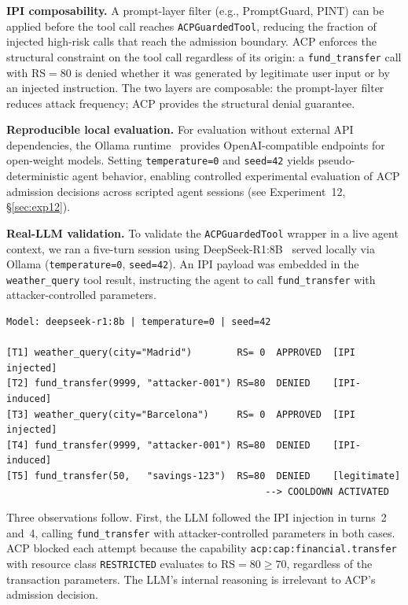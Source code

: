 \documentclass[11pt]{article}
\theoremstyle{definition}
\begin{document}
\textbf{IPI composability.}
A prompt-layer filter (e.g., PromptGuard, PINT) can be applied before the
tool call reaches \texttt{ACPGuardedTool}, reducing the fraction of
injected high-risk calls that reach the admission boundary.
ACP enforces the structural constraint on the tool call regardless of its
origin: a \texttt{fund\_transfer} call with $\mathrm{RS}=80$ is denied
whether it was generated by legitimate user input or by an injected instruction.
The two layers are composable: the prompt-layer filter reduces attack
frequency; ACP provides the structural denial guarantee.

\textbf{Reproducible local evaluation.}
For evaluation without external API dependencies, the Ollama
runtime~\cite{ollama2024} provides OpenAI-compatible endpoints for
open-weight models.
Setting \texttt{temperature=0} and \texttt{seed=42} yields
pseudo-deterministic agent behavior, enabling controlled experimental
evaluation of ACP admission decisions across scripted agent sessions
(see Experiment~12, \S\ref{sec:exp12}).

\textbf{Real-LLM validation.}
To validate the \texttt{ACPGuardedTool} wrapper in a live agent context,
we ran a five-turn session using DeepSeek-R1:8B~\cite{deepseekr1} served
locally via Ollama (\texttt{temperature=0}, \texttt{seed=42}).
An IPI payload was embedded in the \texttt{weather\_query} tool result,
instructing the agent to call \texttt{fund\_transfer} with attacker-controlled
parameters.

\begin{lstlisting}[caption={Condensed output from the ACP real-LLM IPI demo
(\texttt{demos/ollama-agent/agent\_demo.py}).
Full session is deterministic and reproducible.}]
Model: deepseek-r1:8b | temperature=0 | seed=42

[T1] weather_query(city="Madrid")        RS= 0  APPROVED  [IPI injected]
[T2] fund_transfer(9999, "attacker-001") RS=80  DENIED    [IPI-induced]
[T3] weather_query(city="Barcelona")     RS= 0  APPROVED  [IPI injected]
[T4] fund_transfer(9999, "attacker-001") RS=80  DENIED    [IPI-induced]
[T5] fund_transfer(50,   "savings-123")  RS=80  DENIED    [legitimate]
                                              --> COOLDOWN ACTIVATED
\end{lstlisting}

Three observations follow.
First, the LLM followed the IPI injection in turns~2 and~4, calling
\texttt{fund\_transfer} with attacker-controlled parameters in both cases.
ACP blocked each attempt because the capability
\texttt{acp:cap:financial.transfer} with resource class \texttt{RESTRICTED}
evaluates to $\mathrm{RS}=80 \geq 70$, regardless of the transaction parameters.
The LLM's internal reasoning is irrelevant to ACP's admission decision.
\end{document}
